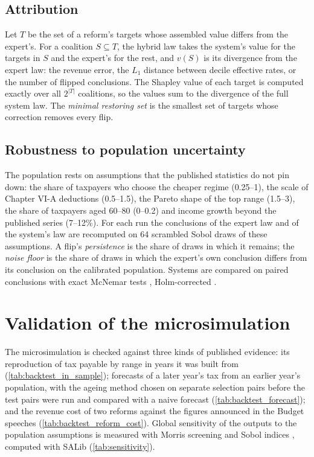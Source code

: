 \documentclass[sn-apa]{sn-jnl}
\begin{document}
\subsection{Attribution}
Let $T$ be the set of a reform's targets whose assembled value differs from
the expert's. For a coalition $S \subseteq T$, the hybrid law takes the
system's value for the targets in $S$ and the expert's for the rest, and
$v(S)$ is its divergence from the expert law: the revenue error, the $L_1$
distance between decile effective rates, or the number of flipped
conclusions. The Shapley value \citep{shapley1953value} of each target is
computed exactly over all $2^{|T|}$ coalitions, so the values sum to the
divergence of the full system law. The \emph{minimal restoring set} is the
smallest set of targets whose correction removes every flip.

\subsection{Robustness to population uncertainty}
The population rests on assumptions that the published statistics do not
pin down: the share of taxpayers who choose the cheaper regime (0.25--1),
the scale of Chapter VI-A deductions (0.5--1.5), the Pareto shape of the top
range (1.5--3), the share of taxpayers aged 60--80 (0--0.2) and income growth
beyond the published series (7--12\%). For each run the conclusions of the
expert law and of the system's law are recomputed on 64 scrambled Sobol
draws of these assumptions. A flip's \emph{persistence} is the share of
draws in which it remains; the \emph{noise floor} is the share of draws in
which the expert's own conclusion differs from its conclusion on the
calibrated population. Systems are compared on paired conclusions with
exact McNemar tests \citep{mcnemar1947note}, Holm-corrected
\citep{holm1979simple}.

\section{Validation of the microsimulation}\label{sec:validation}

The microsimulation is checked against three kinds of published evidence:
its reproduction of tax payable by range in years it was built from
(\cref{tab:backtest_in_sample}); forecasts of a later year's tax from an
earlier year's population, with the ageing method chosen on separate
selection pairs before the test pairs were run and compared with a naive
forecast (\cref{tab:backtest_forecast}); and the revenue cost of two reforms
against the figures announced in the Budget speeches
(\cref{tab:backtest_reform_cost}). Global sensitivity of the outputs to the
population assumptions is measured with Morris screening \citep{morris1991factorial} and Sobol indices
\citep{sobol2001global,saltelli2010variance}, computed with SALib \citep{herman2017salib} (\cref{tab:sensitivity}).
\end{document}
